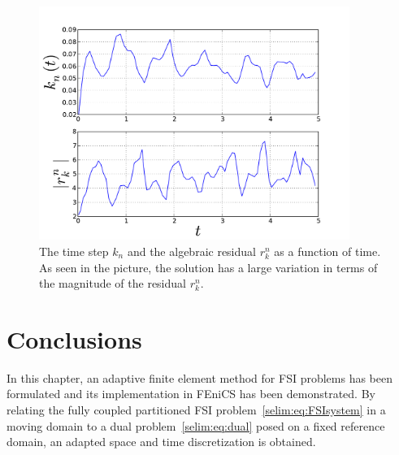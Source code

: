  \begin{figure}
\label{selim:fig:cavity_timestep}
\caption{The time step $k_n$ and the algebraic residual $r_k^n$ as
  a function of time. As seen in the picture, the solution has a large
  variation in terms of the magnitude of the residual $r_k^n$.}
\includegraphics[width=0.9\textwidth]{chapters/selim/pdf/plot.pdf}
\end{figure}

\section{Conclusions}

In this chapter, an adaptive finite element method for FSI problems
has been formulated and its implementation in FEniCS has been
demonstrated. By relating the fully coupled partitioned FSI
problem~\eqref{selim:eq:FSIsystem} in a moving domain to a dual
problem~\eqref{selim:eq:dual} posed on a fixed reference domain, an
adapted space and time discretization is obtained.




